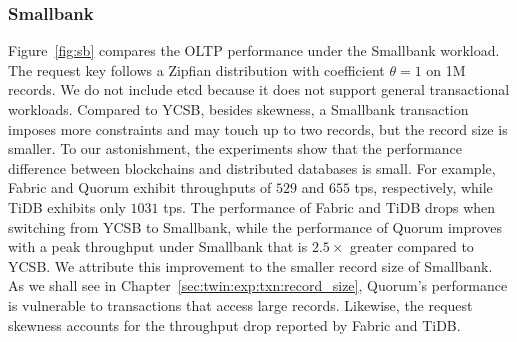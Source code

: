 \subsubsection{Smallbank}

Figure~\ref{fig:sb} compares the OLTP performance under the Smallbank workload.
The request key follows a Zipfian distribution with coefficient $\theta=1$ on 1M
records.
We do not include etcd because it does not support general transactional
workloads.
Compared to YCSB, besides skewness, a Smallbank transaction imposes more
constraints and may touch up to two records, but the record size is smaller.
To our astonishment, the experiments show that the performance difference
between blockchains and distributed databases is small. For example, Fabric and
Quorum exhibit throughputs of $529$ and $655$ tps, respectively, while TiDB
exhibits only $1031$ tps.
The performance of Fabric and TiDB drops when switching from YCSB to Smallbank,
while the performance of Quorum improves with a peak throughput under Smallbank
that is $2.5\times$ greater compared to YCSB.
We attribute this improvement to the smaller record size of Smallbank.
As we shall see in Chapter~\ref{sec:twin:exp:txn:record_size}, Quorum's performance
is vulnerable to transactions that access large records.
Likewise, the request skewness accounts for the throughput drop reported by Fabric and TiDB. 


